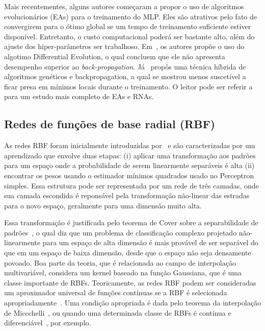 \documentclass[conference]{IEEEtran}
\begin{document}
	Mais recentementes, alguns autores começaram a propor o uso de algoritmos evolucionários (EAs) para o treinamento do MLP. Eles são atrativos pelo fato de convergirem para o ótimo global se um tempo de treinamento suficiente estiver disponível. Entretanto, o custo computacional poderá ser bastante alto, além do ajuste dos hiper-parâmetros ser trabalhoso. Em~\cite{ilonen2003differential}, os autores propõe o uso do algotimo Differential Evolution, o qual concluem que ele não apresenta desempenho superior ao \textit{back-propagation}. Já~\cite{ding2011optimizing} propôs uma técnica híbrida de algoritmos genéticos e backpropagation, a qual se mostrou menos suscetível a ficar presa em mínimos locais durante o treinamento. O leitor pode ser referir a~\cite{mirjalili2019evolutionary} para um estudo mais completo de EAs e RNAs. 
	
	\subsection{Redes de funções de base radial (RBF)}
	As redes RBF foram inicialmente introduzidas por~\cite{broomhead1988multivariablefi} e são caracterizadas por um aprendizado que envolve duas etapas: (i) aplicar uma transformação aos padrões para um espaço onde a probabilidade de serem linearmente separáveis é alta (ii) encontrar os pesos usando o estimador mínimos quadrados usado no Perceptron simples. Essa estrutura pode ser representada por um rede de três camadas, onde sua camada escondida é reponsável pela transformação não-linear das estradas para o novo espaço, geralmente para uma dimensão muito alta. 
	
	Essa transformação é justificada pelo teorema de Cover sobre a separabilidade de padrões~\cite{cover1965geometrical}, o qual diz que um problema de classificação complexo projetado não-linearmente para um espaço de alta dimensão é mais provável de ser separável do que em um espaço de baixa dimensão, desde que o espaço não seja densamente povoado. Boa parte da teoria, que é relacionada ao campo de interpolação multivariável, considera um kernel baseado na função Gaussiana, que é uma classe importante de RBFs. Teoricamente, as redes RBF podem ser consideradas um aproximador universal de funções contínuas se a RBF é selecionada apropriadamente~\cite{poggio1990networks, park1991universal, liao2003relaxed}. Uma condição apropriada é dada pelo teorema da interpolação de Miccchelli~\cite{micchelli1986interpolation}, ou quando uma determinada classe de RBFs é contínua e diferenciável~\cite{park1991universal}, por exemplo.
	 
\end{document}
